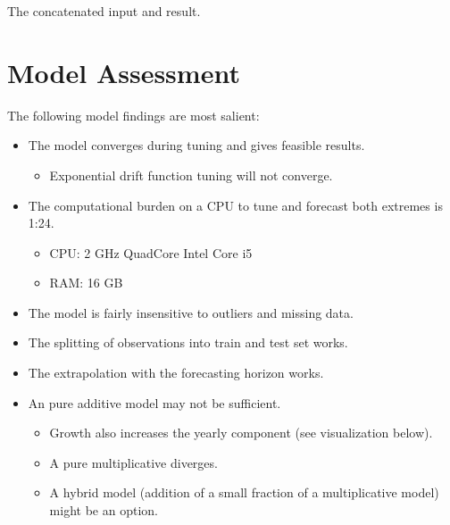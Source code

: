 \documentclass[letterpaper,10pt,english]{sphinxmanual}
\begin{document}
The concatenated input and result.


\section{Model Assessment}
\label{\detokenize{modeling:model-assessment}}
The following model findings are most salient:
\begin{itemize}
\item {} 
The model converges during tuning and gives feasible results.
\begin{itemize}
\item {} 
Exponential drift function tuning will not converge.

\end{itemize}

\item {} 
The computational burden on a CPU to tune and forecast both extremes is 1:24.
\begin{itemize}
\item {} 
CPU: 2 GHz Quad\sphinxhyphen{}Core Intel Core i5

\item {} 
RAM: 16 GB

\end{itemize}

\item {} 
The model is fairly insensitive to outliers and missing data.

\item {} 
The splitting of observations into train and test set works.

\item {} 
The extrapolation with the forecasting horizon works.

\item {} 
An pure additive model may not be sufficient.
\begin{itemize}
\item {} 
Growth also increases the yearly component (see visualization below).

\item {} 
A pure multiplicative diverges.

\item {} 
A hybrid model (addition of a small fraction of a multiplicative model) might be an option.

\end{itemize}

\end{itemize}
\end{document}

